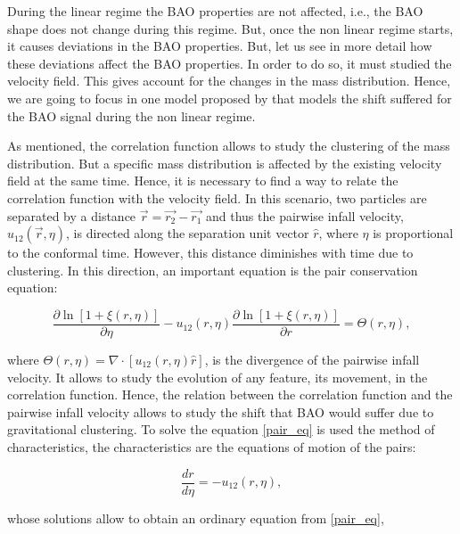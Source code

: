 
During the linear regime the BAO properties are not affected, i.e., the BAO shape does not 
change during this regime. But, once the non linear regime starts, it causes deviations in
the BAO properties. But, let us see in more detail how these deviations affect the BAO
properties. 
In order to do so, it must studied the velocity field. This gives account for the changes
in the mass distribution. Hence, we are going to focus in one model proposed by \cite{motion}
that models the shift suffered for the BAO signal during the non linear regime.

As mentioned, the correlation function allows to study the clustering of the mass distribution. But a
specific mass distribution is affected by the existing velocity field at the same time.  
Hence, it is necessary to find a way to relate the correlation function with the velocity 
field. In this scenario, two particles are separated by
a distance $\vec{r} = \vec{r_2} - \vec{r_1}$ and thus the pairwise infall velocity, 
$u_{12}(\vec{r},\eta)$, is directed along the separation unit vector $\hat{r}$, where
$\eta$ is proportional to the conformal time.
However, this distance diminishes with time due to clustering. In this direction, 
an important equation is the pair conservation equation:

\begin{equation}
\frac{\partial \ln[1+\xi(r,\eta)]}{\partial \eta} - u_{12}(r,\eta)\frac{\partial \ln[1+\xi(r,\eta)]}{\partial r} = \Theta(r,\eta),
\label{pair_eq}
\end{equation}

where $\Theta(r,\eta) = \nabla \cdot [u_{12}(r,\eta)\hat{r}]$, is the divergence 
of the pairwise infall velocity. 
It allows to study the evolution of any feature, its movement, in the correlation function.
Hence, the relation between the correlation function and the pairwise infall velocity allows
to study the shift that BAO would suffer due to gravitational clustering. 
To solve the equation \ref{pair_eq} is used the method of characteristics, the characteristics 
are the equations of motion  of the pairs: 

\begin{equation}
\frac{dr}{d\eta}=-u_{12}(r,\eta),
\label{charact}
\end{equation}

whose solutions allow to obtain an ordinary equation from \ref{pair_eq}, 

